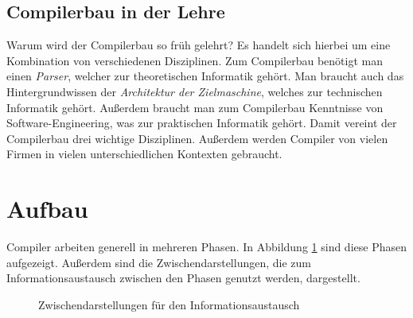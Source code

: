 \documentclass[
  ngerman,
  DIV=12
]{scrartcl}
\begin{document}
\subsection{Compilerbau in der Lehre}

Warum wird der Compilerbau so früh gelehrt? Es handelt sich hierbei um eine Kombination von verschiedenen Disziplinen. Zum Compilerbau benötigt man einen \emph{Parser}, welcher zur theoretischen Informatik gehört. Man braucht auch das Hintergrundwissen der \emph{Architektur der Zielmaschine}, welches zur technischen Informatik gehört. Außerdem braucht man zum Compilerbau Kenntnisse von Software-Engineering, was zur praktischen Informatik gehört. Damit vereint der Compilerbau drei wichtige Disziplinen. Außerdem werden Compiler von vielen Firmen in vielen unterschiedlichen Kontexten gebraucht. 

\section{Aufbau}

Compiler arbeiten generell in mehreren Phasen. In Abbildung \ref{fig:compilerstages} sind diese Phasen aufgezeigt. Außerdem sind die  Zwischendarstellungen, die zum Informationsaustausch zwischen den Phasen genutzt werden, dargestellt.

\begin{figure}\centering
{}
\caption{Zwischendarstellungen für den Informationsaustausch}\label{fig:compilerstages}
\end{figure}
\end{document}
